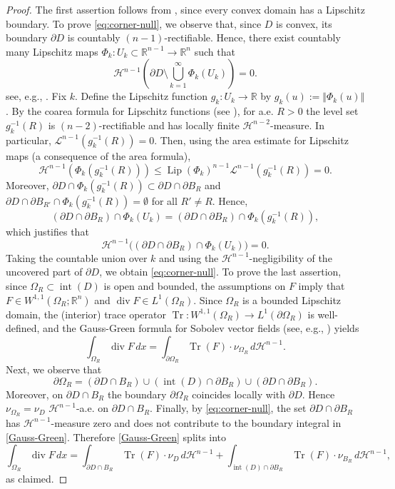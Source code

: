 \documentclass[11pt]{amsart}
\newcommand{\1}{\mathds{1}}
\theoremstyle{definition}
\theoremstyle{remark}
\theoremstyle{definition}
\begin{document}
\begin{proof}
The first assertion follows from \cite[Chapter~1]{MR775683}, since every convex domain has a Lipschitz boundary. To prove \eqref{eq:corner-null}, we observe that, since $D$ is convex, its boundary $\partial D$ is countably $(n-1)$-rectifiable. Hence, there exist countably many Lipschitz maps $\Phi_k\colon U_k \subset \mathbb{R}^{n-1}\to \mathbb{R}^n$ such that
$$
\mathcal{H}^{n-1}\left(\partial D \setminus \bigcup_{k=1}^\infty \Phi_k(U_k) \right)=0.
$$
see, e.g., \cite{MR257325}. Fix $k$. Define the Lipschitz function $g_k\colon U_k \to \mathbb{R}$ by $g_k(u):=\Vert \Phi_k(u)\Vert$. By the coarea formula for Lipschitz functions (see \cite[Chapter~1]{MR3409135}), for a.e. $R>0$ the level set $g_k^{-1}(R)$ is $(n-2)$-rectifiable and has locally finite $\mathcal{H}^{n-2}$-measure. In particular, $\mathcal{L}^{n-1}(g_k^{-1}(R))=0$. Then, using the area estimate for Lipschitz maps (a consequence of the area formula),
$$
\mathcal{H}^{n-1}(\Phi_k(g_k^{-1}(R)))\leq \operatorname{Lip}(\Phi_k)^{n-1} \mathcal{L}^{n-1}(g_k^{-1}(R))=0.
$$
Moreover, $\partial D\cap  \Phi_k(g_k^{-1}(R))\subset \partial D\cap \partial B_R$ and $\partial D\cap \partial {B}_{R'} \cap \Phi_k(g_k^{-1}(R)) = \emptyset$ for all $R' \neq R$. Hence,  $$(\partial D\cap \partial B_R)\cap \Phi_k(U_k) = (\partial D\cap \partial B_R)\cap \Phi_k(g^{-1}_k(R)), $$ which justifies that 
$$
\mathcal{H}^{n-1}\big((\partial D\cap \partial B_R)\cap \Phi_k(U_k)\big)=0.
$$
Taking the countable union over $k$ and using the $\mathcal{H}^{n-1}$-negligibility of the uncovered part of $\partial D$, we obtain \eqref{eq:corner-null}. To prove the last assertion, since $\Omega_R\subset \operatorname{int}(D)$ is open and bounded, the assumptions on $F$ imply that $F\in W^{1,1}(\Omega_R;\mathbb{R}^n)$ and $\operatorname{div}F\in L^1(\Omega_R)$. Since $\Omega_R$ is a bounded Lipschitz domain, the (interior) trace operator $\operatorname{Tr}\colon W^{1,1}(\Omega_R)\to L^1(\partial \Omega_R)$ is well-defined, and the Gauss-Green formula for Sobolev vector fields (see, e.g., \cite[Chapter~6]{MR3726909}) yields
\begin{equation}\label{Gauss-Green}
\int_{\Omega_R}\operatorname{div}F\,dx=\int_{\partial \Omega_R}\operatorname{Tr}(F)\cdot \nu_{\Omega_R}\, d\mathcal{H}^{n-1}.    
\end{equation}
Next, we observe that
$$
\partial \Omega_R=(\partial D\cap B_R)\cup (\operatorname{int}(D)\cap \partial B_R)\cup (\partial D \cap \partial B_R).
$$
Moreover, on $\partial D\cap B_R$ the boundary $\partial \Omega_R$ coincides locally with $\partial D$.  Hence $\nu_{\Omega_R}=\nu_D$ $\mathcal{H}^{n-1}$-a.e. on $\partial D\cap B_R$. Finally, by \eqref{eq:corner-null}, the set $\partial D\cap \partial B_R$ has $\mathcal{H}^{n-1}$-measure zero and does not contribute to the boundary integral in \eqref{Gauss-Green}. Therefore \eqref{Gauss-Green} splits into
$$
\int_{\Omega_R}\operatorname{div}F\,dx=\int_{\partial D\cap B_R}\operatorname{Tr}(F)\cdot \nu_D\, d\mathcal{H}^{n-1}+\int_{\operatorname{int}(D)\cap \partial B_R}\operatorname{Tr}(F)\cdot \nu_{B_R}\,d\mathcal{H}^{n-1},
$$
as claimed.
\end{proof}
\end{document}
